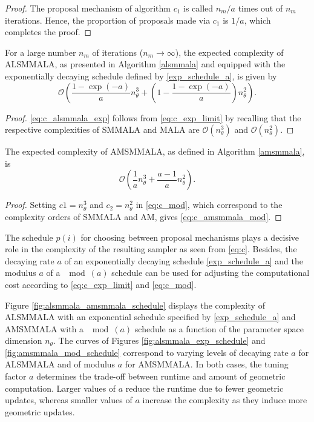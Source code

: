 \documentclass[twoside,11pt]{article}
\begin{document}
\begin{proof}
The proposal mechanism of algorithm $c_1$ is called $n_m/a$ times out of $n_m$ iterations. Hence, the proportion of proposals
made via $c_1$ is $1/a$, which completes the proof.
\end{proof}

\begin{lemma}
For a large number $n_m$ of iterations ($n_m\rightarrow\infty$), the expected complexity of ALSMMALA, as presented in 
Algorithm \ref{alsmmala} and equipped with the exponentially decaying schedule defined by \eqref{exp_schedule_a}, is given by
\begin{equation}
\label{eq:c_alsmmala_exp}
\mathcal{O}\left(
\dfrac{1-\exp{(-a)}}{a}n_{\theta}^3+
\left(1-\dfrac{1-\exp{(-a)}}{a}\right)n_{\theta}^2
\right).
\end{equation}
\end{lemma}

\begin{proof}
\eqref{eq:c_alsmmala_exp} follows from \eqref{eq:c_exp_limit} by recalling that the respective complexities of SMMALA and 
MALA are $\mathcal{O}(n_{\theta}^3)$ and $\mathcal{O}(n_{\theta}^2)$.
\end{proof}

\begin{lemma}
The expected complexity of AMSMMALA, as defined in Algorithm \ref{amsmmala}, is
\begin{equation}
\label{eq:c_amsmmala_mod}
\mathcal{O}\left(
\dfrac{1}{a}n_{\theta}^3+
\dfrac{a-1}{a}n_{\theta}^2
\right).
\end{equation}
\end{lemma}

\begin{proof}
Setting $c1=n_{\theta}^3$ and $c_2=n_{\theta}^2$ in \eqref{eq:c_mod}, which correspond to the complexity orders of SMMALA 
and AM, gives \eqref{eq:c_amsmmala_mod}.
\end{proof}

The schedule $p(i)$ for choosing between proposal mechanisms plays a decisive role in the complexity of the resulting sampler
as seen from \eqref{eq:c}. Besides, the decaying rate $a$ of an exponentially decaying schedule \eqref{exp_schedule_a} and 
the modulus $a$ of a $\mod{(a)}$ schedule can be used for adjusting the computational cost according to 
\eqref{eq:c_exp_limit} and \eqref{eq:c_mod}.

Figure \ref{fig:alsmmala_amsmmala_schedule} displays the complexity of ALSMMALA with an exponential schedule specified by
\eqref{exp_schedule_a} and AMSMMALA with a $\mod{(a)}$ schedule as a function of the parameter space dimension $n_{\theta}$.
The curves of Figures \ref{fig:alsmmala_exp_schedule} and \ref{fig:amsmmala_mod_schedule} correspond to varying levels of 
decaying rate $a$ for ALSMMALA and of modulus $a$ for AMSMMALA. In both cases, the tuning factor $a$ determines the 
trade-off between runtime and amount of geometric computation. Larger values of $a$ reduce the runtime due to fewer 
geometric updates, whereas smaller values of $a$ increase the complexity as they induce more geometric updates.
\end{document}
